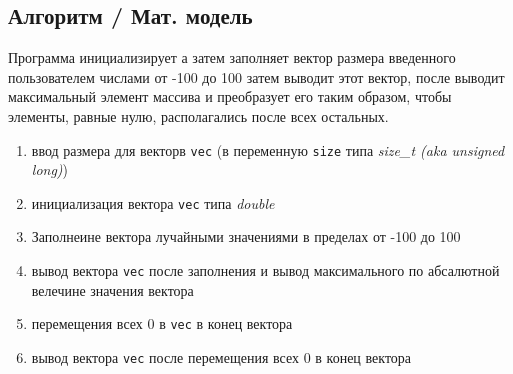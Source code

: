 \documentclass[14pt,a4paper]{article}
\begin{document}
\subsection{Алгоритм / Мат. модель}
Программа инициализирует а затем заполняет вектор размера введенного
пользователем числами от -100 до 100 затем выводит этот вектор,
после выводит максимальный элемент массива и преобразует его таким
образом, чтобы элементы, равные нулю, располагались после всех остальных.
\begin{enumerate}
  \item ввод размера для векторв \texttt{vec} (в переменную \texttt{size} типа
    \textit{size\_t (aka unsigned long)})
  \item инициализация вектора \texttt{vec} типа \textit{double}
  \item Заполнеине вектора лучайными значениями в пределах от -100 до 100
  \item вывод вектора \texttt{vec} после заполнения и вывод максимального
    по абсалютной велечине значения вектора
  \item перемещения всех 0 в \texttt{vec} в конец вектора
  \item вывод вектора \texttt{vec} после перемещения всех 0 в конец вектора
\end{enumerate}
\end{document}
